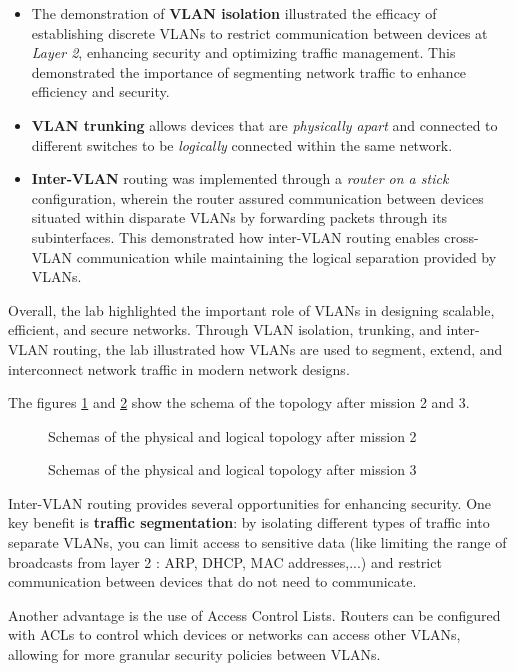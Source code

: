 \documentclass[10pt,a4paper]{ULBreport}
\begin{document}
\begin{itemize}
    \item The demonstration of \textbf{VLAN isolation} illustrated the efficacy of establishing discrete VLANs to restrict communication between devices at \textit{Layer 2}, enhancing security and optimizing traffic management. This demonstrated the importance of segmenting network traffic to enhance efficiency and security.
    \item \textbf{VLAN trunking} allows devices that are \textit{physically apart} and connected to different switches to be \textit{logically} connected within the same network.
    \item \textbf{Inter-VLAN} routing was implemented through a \textit{router on a stick} configuration, wherein the router assured communication between devices situated within disparate VLANs by forwarding packets through its subinterfaces. This demonstrated how inter-VLAN routing enables cross-VLAN communication while maintaining the logical separation provided by VLANs.
\end{itemize}

Overall, the lab highlighted the important role of VLANs in designing scalable, efficient, and secure networks. Through VLAN isolation, trunking, and inter-VLAN routing, the lab illustrated how VLANs are used to segment, extend, and interconnect network traffic in modern network designs.

The figures \ref{Mission2} and \ref{Mission3} show the schema of the topology after mission 2 and 3.

\begin{figure}[H]
    \centering
    
    \caption{Schemas of the physical and logical topology after mission 2}
    \label{Mission2}
\end{figure}

\begin{figure}[H]
    \centering
    
    \caption{Schemas of the physical and logical topology after mission 3}
    \label{Mission3}
\end{figure}


Inter-VLAN routing provides several opportunities for enhancing security. One key benefit is \textbf{traffic segmentation}: by isolating different types of traffic into separate VLANs, you can limit access to sensitive data (like limiting the range of broadcasts from layer 2 : ARP, DHCP, MAC addresses,...) and restrict communication between devices that do not need to communicate. \par
Another advantage is the use of Access Control Lists. Routers can be configured with ACLs to control which devices or networks can access other VLANs, allowing for more granular security policies between VLANs.

\end{document}
